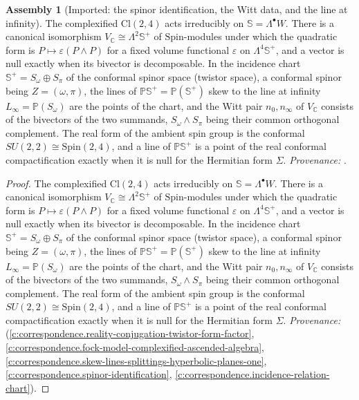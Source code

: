 \documentclass[11pt]{article}
\theoremstyle{definition}
\newtheorem{assembled}[theorem]{Assembly}
\theoremstyle{plain}
\providecommand{\C}{}\renewcommand{\C}{\mathbb{C}}
\providecommand{\CS}{}\renewcommand{\CS}{{\mathbb{S}^{+}}}
\providecommand{\Cl}{}\renewcommand{\Cl}{\mathrm{Cl}}
\providecommand{\PCS}{}\renewcommand{\PCS}{\mathbb{P}{\mathbb{S}^{+}}}
\providecommand{\Som}{}\renewcommand{\Som}{S_\omega}
\providecommand{\Sp}{}\renewcommand{\Sp}{\mathbb{S}}
\providecommand{\Spi}{}\renewcommand{\Spi}{S_\pi}
\begin{document}
\begin{assembled}[Imported: the spinor identification, the Witt data, and the line at infinity]\label{c:rungs.imported-spinor-identification-witt-data-line}
The complexified $\Cl(2,4)$ acts irreducibly on $\Sp = \Lambda^{\bullet}W$. There is a canonical isomorphism $V_{\C} \cong \Lambda^{2}\CS$ of $\mathrm{Spin}$-modules under which the quadratic form is $P \mapsto \varepsilon(P \wedge P)$ for a fixed volume functional $\varepsilon$ on $\Lambda^{4}\CS$, and a vector is null exactly when its bivector is decomposable. In the incidence chart $\CS = \Som \oplus \Spi$ of the conformal spinor space (twistor space), a conformal spinor being $Z = (\omega, \pi)$, the lines of $\PCS = \mathbb{P}(\CS)$ skew to the line at infinity $L_{\infty} = \mathbb{P}(\Som)$ are the points of the chart, and the Witt pair $n_{0}, n_{\infty}$ of $V_{\C}$ consists of the bivectors of the two summands, $\Som \wedge \Spi$ being their common orthogonal complement. The real form of the ambient spin group is the conformal $SU(2,2) \cong \mathrm{Spin}(2,4)$, and a line of $\PCS$ is a point of the real conformal compactification exactly when it is null for the Hermitian form $\Sigma$. \emph{Provenance:} \cite[Rem.~3.2, Thms.~3.1, 3.4, 4.2, Props.~4.1, 4.5]{ButlerT9}.
\end{assembled}
\begin{proof}
The complexified $\Cl(2,4)$ acts irreducibly on $\Sp = \Lambda^{\bullet}W$. There is a canonical isomorphism $V_{\C} \cong \Lambda^{2}\CS$ of $\mathrm{Spin}$-modules under which the quadratic form is $P \mapsto \varepsilon(P \wedge P)$ for a fixed volume functional $\varepsilon$ on $\Lambda^{4}\CS$, and a vector is null exactly when its bivector is decomposable. In the incidence chart $\CS = \Som \oplus \Spi$ of the conformal spinor space (twistor space), a conformal spinor being $Z = (\omega, \pi)$, the lines of $\PCS = \mathbb{P}(\CS)$ skew to the line at infinity $L_{\infty} = \mathbb{P}(\Som)$ are the points of the chart, and the Witt pair $n_{0}, n_{\infty}$ of $V_{\C}$ consists of the bivectors of the two summands, $\Som \wedge \Spi$ being their common orthogonal complement. The real form of the ambient spin group is the conformal $SU(2,2) \cong \mathrm{Spin}(2,4)$, and a line of $\PCS$ is a point of the real conformal compactification exactly when it is null for the Hermitian form $\Sigma$. \emph{Provenance:} \cite[Rem.~3.2, Thms.~3.1, 3.4, 4.2, Props.~4.1, 4.5]{ButlerT9} (\ref{c:correspondence.reality-conjugation-twistor-form-factor}, \ref{c:correspondence.fock-model-complexified-ascended-algebra}, \ref{c:correspondence.skew-lines-splittings-hyperbolic-planes-one}, \ref{c:correspondence.spinor-identification}, \ref{c:correspondence.incidence-relation-chart}).

\end{proof}
\end{document}
